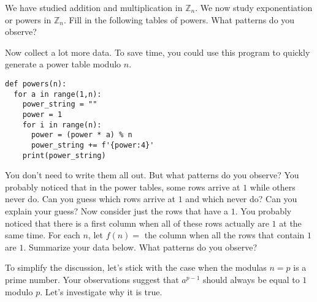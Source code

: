 \documentclass[12pt]{exam}
\newcommand{\Z}{\mathbb Z}
\begin{document}
\begin{questions}
  \question We have studied addition and multiplication in $\Z_n$. We now study exponentiation or powers in $\Z_n$. Fill in the following tables of powers. What patterns do you observe?
  \begin{center}
    
    
  \end{center}
  \newpage
  \question Now collect a lot more data. To save time, you could use this program to quickly generate a power table modulo $n$.
  \begin{lstlisting}
def powers(n):
  for a in range(1,n):
    power_string = ""
    power = 1
    for i in range(n):
      power = (power * a) % n
      power_string += f'{power:4}'
    print(power_string)
  \end{lstlisting}
  You don't need to write them all out. But what patterns do you observe?
  \newpage
  \question You probably noticed that in the power tables, some rows arrive at $1$ while others never do. Can you guess which rows arrive at $1$ and which never do? Can you explain your guess?
  \vspace{2in}
  \question Now consider just the rows that have a $1$. You probably noticed that there is a first column when all of these rows actually are $1$ at the same time. For each $n$, let $f(n)=$ the column when all the rows that contain $1$ are $1$. Summarize your data below. What patterns do you observe?
  \begin{center}
  \end{center}
  \newpage
  \question To simplify the discussion, let's stick with the case when the modulas $n=p$ is a prime number. Your observations suggest that $a^{p-1}$ should always be equal to $1$ modulo $p$. Let's investigate why it is true.
  \begin{parts}

\end{parts}
\end{questions}
\end{document}

